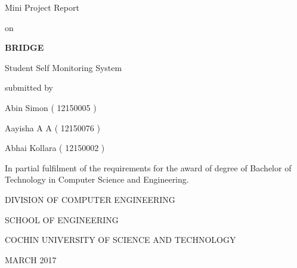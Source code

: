 \vspace*{\fill}

\begin{center}
\Large
Mini Project Report

\hspace{0.7em}

on

\hspace{0.7em}

\Large{\bfseries{BRIDGE}}

\normalsize
Student Self Monitoring System

\hspace{1em}

submitted by

\hspace{1em}

\large
Abin Simon ( 12150005 )

\large
Aayisha A A ( 12150076 )

\large
Abhai Kollara ( 12150002 )

\hspace{1em}

\normalsize
In partial fulfilment of the requirements for the award of degree of Bachelor of Technology in Computer Science and Engineering.

\hspace{1em}

\large
DIVISION OF COMPUTER ENGINEERING

SCHOOL OF ENGINEERING

\hspace{1em}

COCHIN UNIVERSITY OF SCIENCE AND TECHNOLOGY

\hspace{1em}

\normalsize
MARCH 2017
\end{center}

\vspace*{\fill}
